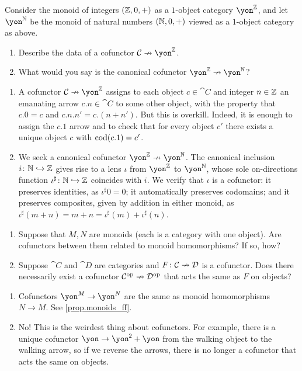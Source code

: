 \documentclass[Book-Poly]{subfiles}
\begin{document}
\begin{exercise}
Consider the monoid of integers $(\mathbb{Z},0,+)$ as a $1$-object category $\yon^\zz$, and let $\yon^\nn$ be the monoid of natural numbers $(\mathbb{N},0,+)$ viewed as a $1$-object category as above.
\begin{enumerate}
	\item Describe the data of a cofunctor $\cat{C}\cof\yon^\zz$.
	\item What would you say is the canonical cofunctor $\yon^\zz\cof\yon^\nn$?
\qedhere
\end{enumerate}
\begin{solution}
\begin{enumerate}
    \item A cofunctor $\cat{C}\cof\yon^\zz$ assigns to each object $c\in\cat{C}$ and integer $n\in\mathbb{Z}$ an emanating arrow $c.n\in\cat{C}$ to some other object, with the property that $c.0=c$ and $c.n.n'=c.(n+n')$. But this is overkill. Indeed, it is enough to assign the $c.1$ arrow and to check that for every object $c'$ there exists a unique object $c$ with $\operatorname{cod}(c.1)=c'$.
    \item We seek a canonical cofunctor $\yon^\zz\cof\yon^\nn$.
    The canonical inclusion $i\colon\mathbb{N}\hookrightarrow\mathbb{Z}$ gives rise to a lens $\iota$ from $\yon^\zz$ to $\yon^\nn$, whose sole on-directions function $\iota^\sharp\colon\mathbb{N}\hookrightarrow\mathbb{Z}$ coincides with $i$.
    We verify that $\iota$ is a cofunctor: it preserves identities, as $\iota^\sharp0=0$; it automatically preserves codomains; and it preserves composites, given by addition in either monoid, as $\iota^\sharp(m+n)=m+n=\iota^\sharp(m)+\iota^\sharp(n)$.
\end{enumerate}
\end{solution}
\end{exercise}

\begin{exercise}
\begin{enumerate}
	\item Suppose that $M,N$ are monoids (each is a category with one object).
	Are cofunctors between them related to monoid homomorphisms? If so, how?
	\item Suppose $\cat{C}$ and $\cat{D}$ are categories and $F\colon\mathcal{C}\nrightarrow\mathcal{D}$ is a cofunctor.
	Does there necessarily exist a cofunctor $\mathcal{C}^{\textnormal{op}}\nrightarrow\mathcal{D}^{\textnormal{op}}$ that acts the same as $F$ on objects?
\qedhere
\end{enumerate}
\begin{solution}
\begin{enumerate}
    \item Cofunctors $\yon^M\to\yon^N$ are the same as monoid homomorphisms $N\to M$. See \cref{prop.monoids_ff}.
    \item No! This is the weirdest thing about cofunctors. For example, there is a unique cofunctor $\yon\to\yon^\2+\yon$ from the walking object to the walking arrow, so if we reverse the arrows, there is no longer a cofunctor that acts the same on objects.
\end{enumerate}
\end{solution}
\end{exercise}
\end{document}

